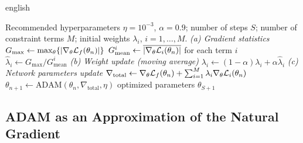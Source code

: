 \begin{hyphenrules}{english}
\begin{algorithm}[htbp]
  \caption{Learning rate annealing with ADAM.}
  \label{alg:lra}
  \begin{algorithmic}[1]
    \Require Recommended hyperparameters $\eta=10^{-3}$, $\alpha=0.9$; number of steps $S$; number of
      constraint terms $M$; initial weights $\lambda_i$, $i=1,\dots,M$.
      \State \textit{(a) Gradient statistics}
      \State $G_{\max}\gets\max_\theta\{\left\lvert \nabla_\theta\mathcal{L}_f(\theta_n) \right\rvert\}$ 
      \State $G^{i}_{\mathrm{mean}}\gets\overline{\left\lvert \nabla_\theta\mathcal{L}_i(\theta_n) \right\rvert}$ for each term $i$
      \State $\hat\lambda_i\gets G_{\max}/G^{i}_{\mathrm{mean}}$ 
      \State \textit{(b) Weight update (moving average)}
      \State $\lambda_i\gets(1-\alpha)\lambda_i+\alpha\hat\lambda_i$ 
      \State \textit{(c) Network parameters update}
      \State $\nabla_{\mathrm{total}}\gets\nabla_\theta\mathcal{L}_f(\theta_n)+\sum_{i=1}^{M}\lambda_i\nabla_\theta\mathcal{L}_i(\theta_n)$
      \State $\theta_{n+1}\gets\mathrm{ADAM}(\theta_n,\nabla_{\mathrm{total}},\eta)$ 
    \EndFor
    \State \Return optimized parameters $\theta_{S+1}$
  \end{algorithmic}
\end{algorithm}

\subsection{ADAM as an Approximation of the Natural Gradient}


\end{hyphenrules}
